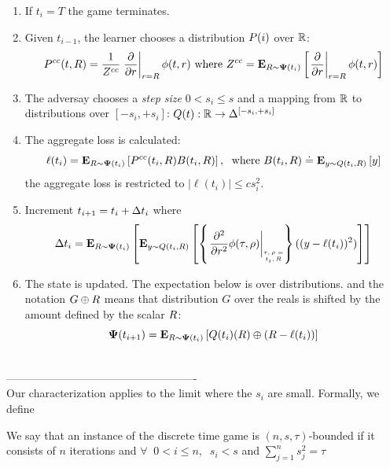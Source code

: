 \documentclass{article}[12pt]
\begin{document}
\begin{enumerate}
\item  If $t_i=T$ the game terminates.
\item Given $t_{i-1}$, the learner chooses a distribution
  $P(i)$ over $\mathbb{R}$:
  \begin{equation} \label{eqn:learner-strat-cc}
  P^{cc}(t,R) =  \frac{1}{Z^{cc}}
  \left. \frac{\partial}{\partial r} \right|_{r=R} \phi(t,r)
  \mbox{ where } Z^{cc} = {\bf E}_{R \sim {\bf \Psi}(t_i)}\left[ \left. \frac{\partial}{\partial r} \right|_{r=R} \phi(t,r) \right]
\end{equation}

\item The adversay chooses a {\em step size} $0<s_i\leq s$ and a mapping from $\mathbb{R}$ to distributions
  over $[-s_i,+s_i]$: $Q(t): \mathbb{R} \to \Delta^{[-s_i,+s_i]}$
\item The aggregate loss is calculated:
  \begin{equation} \label{eqn:ell-discrete}
    \ell(t_i)={\bf E}_{R \sim {\bf \Psi}(t_i)}\left[ P^{cc}(t_i,R)
      B(t_i,R) \right],\;\mbox{ where } B(t_i,R) \doteq {\bf E}_{y \sim Q(t_i,R)}\left[ y \right]
  \end{equation}
  the aggregate loss is restricted to $|\ell(t_i)| \leq c s_i^2$.
\item  Increment $t_{i+1} = t_{i} + \Delta t_i$ where
\begin{equation} \label{eqn:deltat}
  \deltat_i=
  \E{\R \sim \state(t_i)}{\E{y \sim
      \adversM(t_i,\R)}{\at{\frac{\partial^2}{\partial r^2}}
      ((y-\ell(t_i))^2)}}
\end{equation}

\item The state is updated. The expectation below is over
  distributions. and the notation $G \oplus R$ means
  that distribution $G$ over the reals is shifted by the amount
  defined by the scalar $R$:
  $${\bf \Psi}(t_{i+1}) = {\bf E}_{R \sim {\bf \Psi}(t_{i})}\left[ Q(t_i)(R)\oplus (R-\ell(t_i)) \right]
  $$
\end{enumerate}

~\\
----------------------------------------------------
~\\

Our characterization applies to the limit where the $s_i$ are small. Formally, we define
\begin{definition}
We say that an instance of the discrete time game is
$(n,s,\tau)$-bounded if it consists of $n$ iterations and $\forall\;\; 0<i\leq n,\;\; s_i < s$ and $\sum_{j=1}^n s_j^2=\tau$
\end{definition}
\end{document}

